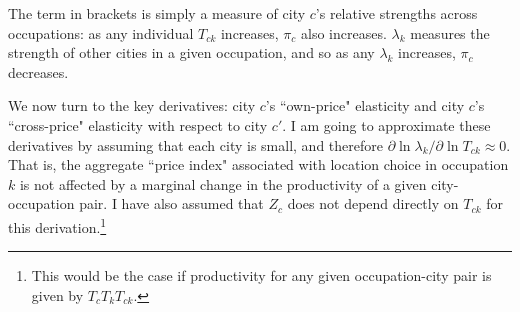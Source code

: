 \documentclass[12pt]{article}
\begin{document}
The term in brackets is simply a measure of city $c$'s relative strengths across occupations: as any individual $T_{ck}$ increases, $\pi_{c}$ also increases. $\lambda_{k}$ measures the strength of other cities in a given occupation, and so as any $\lambda_{k}$ increases, $\pi_{c}$ decreases.

We now turn to the key derivatives: city $c$'s ``own-price" elasticity and city $c$'s ``cross-price" elasticity with respect to city $c'$. I am going to approximate these derivatives by assuming that each city is small, and therefore $\partial\ln\lambda_{k}/\partial\ln{T_{ck}}\approx{0}$. That is, the aggregate ``price index" associated with location choice in occupation $k$ is not affected by a marginal change in the productivity of a given city-occupation pair. I have also assumed that $Z_{c}$ does not depend directly on $T_{ck}$ for this derivation.\footnote{This would be the case if productivity for any given occupation-city pair is given by $T_{c}T_{k}T_{ck}$.}
\end{document}
